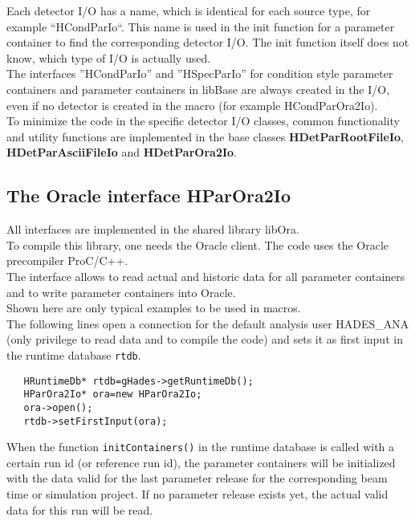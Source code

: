 Each detector I/O has a name, which is identical for each source type, for example ``HCondParIo``. This name is used in the 
init function for a parameter container to find the corresponding detector I/O. The init function itself does not know, which 
type of I/O is actually used.\\

The interfaces ''HCondParIo'' and ''HSpecParIo'' for condition style parameter containers and parameter containers 
in libBase are always created in the I/O, even if no detector is created in the macro (for example HCondParOra2Io).\\

To minimize the code in the specific detector I/O classes, common functionality and utility functions are implemented in the 
base classes \textbf{HDetParRootFileIo}, \textbf{HDetParAsciiFileIo} and \textbf{HDetParOra2Io}.


\subsection[The Oracle interface HParOra2Io]{The Oracle interface HParOra2Io} \label{sec:rtdbHParOra2Io}

All interfaces are implemented in the shared library libOra.\\
To compile this library, one needs the Oracle client. The code uses the Oracle precompiler ProC/C++.\\
The interface allows to read actual and historic data for all parameter containers and to write parameter containers into 
Oracle.\\
Shown here are only typical examples to be used in macros.\\

The following lines open a connection for the default analysis user HADES\_ANA (only privilege to read data and to compile the code) and sets it 
as first input in the runtime database \verb+rtdb+.
\begin{lstlisting}
   HRuntimeDb* rtdb=gHades->getRuntimeDb();
   HParOra2Io* ora=new HParOra2Io;
   ora->open();
   rtdb->setFirstInput(ora);
\end{lstlisting}
When the function \verb+initContainers()+ in the runtime database is called with a certain run id (or reference run id), the 
parameter containers will be initialized with the data valid for the last parameter release for the corresponding beam time or 
simulation project. If no parameter release exists yet, the actual valid data for this run will be read.\\

